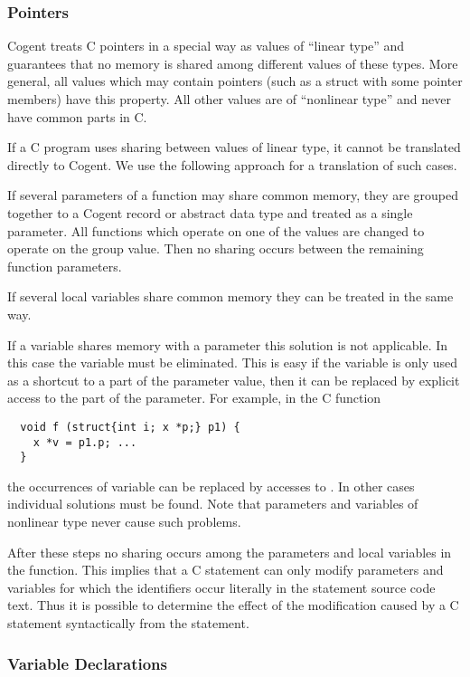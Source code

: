 \subsubsection{Pointers}

Cogent treats C pointers in a special way as values of ``linear type'' and guarantees that no memory is shared
among different values of these types. More general, all values which may contain pointers (such as a struct with
some pointer members) have this property. All other values are of ``nonlinear type'' and never have common parts 
in C.

If a C program uses sharing between values of linear type, it cannot be translated directly to Cogent. We use 
the following approach for a translation of such cases. 

If several parameters of a function may share common memory, they are grouped together to a Cogent record or
abstract data type and treated as a single parameter. All functions which operate on one of the values are
changed to operate on the group value. Then no sharing occurs between the remaining function parameters.

If several local variables share common memory they can be treated in the same way. 

If a variable shares memory with a parameter this solution is not applicable. In this case the variable must be
eliminated. This is easy if the variable is only used as a shortcut to a part of the parameter value, then it
can be replaced by explicit access to the part of the parameter. For example, in the C function
\begin{verbatim}
  void f (struct{int i; x *p;} p1) {
    x *v = p1.p; ...
  }
\end{verbatim}
the occurrences of variable  can be replaced by accesses to . 
In other cases individual solutions must be found. Note that parameters and variables of nonlinear type never
cause such problems.

After these steps no sharing occurs among the parameters and local variables in the function. This implies that 
a C statement can only modify parameters and variables for which the identifiers occur literally in the statement
source code text. Thus it is possible to determine the effect of the modification caused by a C statement
syntactically from the statement.

\subsubsection{Variable Declarations}

